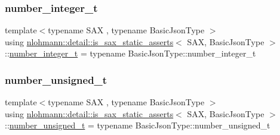\mbox{\label{structnlohmann_1_1detail_1_1is__sax__static__asserts_a474adf99bf1eaa8292284fd3064c80fe}} 
\subsubsection{\texorpdfstring{number\+\_\+integer\+\_\+t}{number\_integer\_t}}
{\footnotesize\ttfamily template$<$typename S\+AX , typename Basic\+Json\+Type $>$ \\
using \hyperlink{structnlohmann_1_1detail_1_1is__sax__static__asserts}{nlohmann\+::detail\+::is\+\_\+sax\+\_\+static\+\_\+asserts}$<$ S\+AX, Basic\+Json\+Type $>$\+::\hyperlink{structnlohmann_1_1detail_1_1is__sax__static__asserts_a474adf99bf1eaa8292284fd3064c80fe}{number\+\_\+integer\+\_\+t} =  typename Basic\+Json\+Type\+::number\+\_\+integer\+\_\+t\hspace{0.3cm}{\ttfamily [private]}}

\mbox{\label{structnlohmann_1_1detail_1_1is__sax__static__asserts_af8733df7fcaebb25434285885db7f127}} 
\subsubsection{\texorpdfstring{number\+\_\+unsigned\+\_\+t}{number\_unsigned\_t}}
{\footnotesize\ttfamily template$<$typename S\+AX , typename Basic\+Json\+Type $>$ \\
using \hyperlink{structnlohmann_1_1detail_1_1is__sax__static__asserts}{nlohmann\+::detail\+::is\+\_\+sax\+\_\+static\+\_\+asserts}$<$ S\+AX, Basic\+Json\+Type $>$\+::\hyperlink{structnlohmann_1_1detail_1_1is__sax__static__asserts_af8733df7fcaebb25434285885db7f127}{number\+\_\+unsigned\+\_\+t} =  typename Basic\+Json\+Type\+::number\+\_\+unsigned\+\_\+t\hspace{0.3cm}{\ttfamily [private]}}

